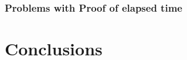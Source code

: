 \documentclass{acm_proc_article-sp}
\begin{document}
\subsubsection{Problems with Proof of elapsed time}


\section{Conclusions}


%




\end{document}
